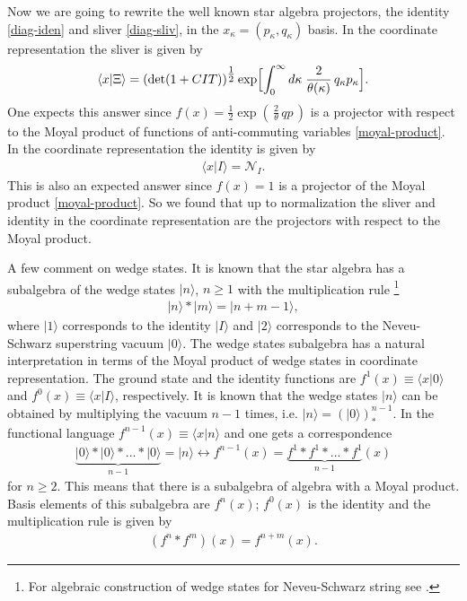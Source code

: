 \documentclass[a4paper,12pt]{article}
\newcommand{\Nc}{\mathcal{N}}
\begin{document}
Now we
are going to rewrite the well known star algebra projectors,
the identity \eqref{diag-iden}
and sliver \eqref{diag-sliv},
in the $x_{\kappa}=(p_{\kappa},q_{\kappa})$ basis.
In the coordinate representation the sliver is given by
\begin{equation}
\langle
x|\Xi\rangle=(\det(1+CIT))^{\tfrac12}
\exp\Bigl[\int_{0}^{\infty}d\kappa\;
\frac{2}{\theta(\kappa)}\,q_{\kappa}p_{\kappa}\Bigr].
\end{equation}
One expects this answer since $f(x)=\tfrac{1}{2}\exp(\,\tfrac{2}{\theta}\,qp\,)$
is a projector with respect to the Moyal product of functions of anti-commuting
variables \eqref{moyal-product}.
In the coordinate representation the identity is given by
\begin{gather}
\langle x|I\rangle=\Nc_{I}.
\end{gather}
This is also an expected answer since $f(x)=1$ is a projector of the
Moyal product \eqref{moyal-product}.
So we found that up to normalization
the sliver and identity in the coordinate representation
are the projectors with respect to the Moyal product.

A few comment on wedge states.
It is known that the star algebra has a subalgebra of
the wedge states $|n\rangle$, $n\geq 1$
with the multiplication rule \cite{RZ}
\footnote{For algebraic construction of wedge states
for Neveu-Schwarz string see \cite{0203227}.}
\begin{gather}
|n\rangle*|m\rangle=|n+m-1\rangle,
\end{gather}
where $|1\rangle$ corresponds to the identity $|I\rangle$
and $|2\rangle$ corresponds
to the Neveu-Schwarz superstring vacuum $|0\rangle$.
The wedge states subalgebra
has a natural interpretation in terms of the Moyal
product of wedge states in coordinate representation.
The ground state and the identity
functions are  $f^{1}(x)\equiv\langle x|0\rangle$ and
$f^{0}(x)\equiv\langle x|I\rangle$, respectively.
It is known that the wedge states $|n\rangle$ can be obtained
by multiplying the vacuum $n-1$ times,
i.e. $|n\rangle=(|0\rangle)_{*}^{n-1}$.
In the functional language $f^{n-1}(x)\equiv\langle x|n\rangle$
and one gets a correspondence
\begin{gather}
\underbrace{|0\rangle *|0\rangle* ...*|0\rangle}_{n-1}=|n\rangle \longleftrightarrow
f^{n-1}(x)=\underbrace{f^{1}*f^{1}*...*f^{1}}_{n-1}(x)
\end{gather}
for $n\geq 2$. This means
that there is a subalgebra of algebra with a Moyal product.
Basis elements of this subalgebra are $f^{n}(x)$; $f^{0}(x)$
is the identity and the multiplication rule is given by
\begin{gather}
(f^{n}*f^{m})(x)=f^{n+m}(x).
\end{gather}
\end{document}
